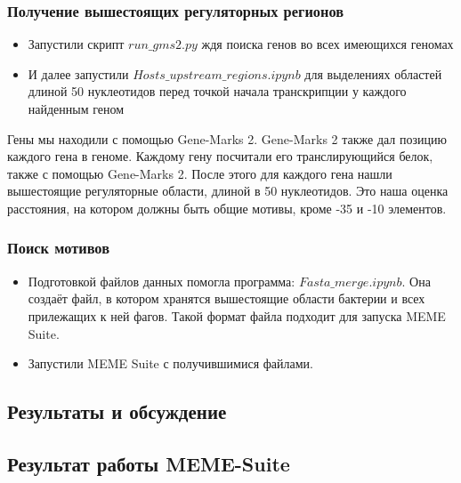 \documentclass[14pt]{extarticle}
\begin{document}
    \begin{center}
    \item \subsubsection{Получение вышестоящих регуляторных регионов}
    \end{center}
        \begin{itemize}
            \item Запустили скрипт \(run\_gms2.py\) ждя поиска генов во всех имеющихся геномах
            \item И далее запустили \(Hosts\_upstream\_regions.ipynb\) для выделениях областей длиной 50 нуклеотидов 
            перед точкой начала транскрипции у каждого найденным геном
        \end{itemize}
    \par{Гены мы находили с помощью Gene-Marks 2. Gene-Marks 2 также дал позицию каждого гена в геноме. Каждому гену 
    посчитали его транслирующийся белок, также с помощью Gene-Marks 2. После этого для каждого гена нашли вышестоящие 
    регуляторные области, длиной в 50 нуклеотидов. Это наша оценка расстояния, на котором должны быть общие мотивы, 
    кроме -35 и -10 элементов.}
    \begin{center}
    \item \subsubsection{Поиск мотивов}
    \end{center}
        \begin{itemize}
            \item Подготовкой файлов данных помогла программа: \(Fasta\_merge.ipynb\). Она создаёт файл, в котором 
            хранятся вышестоящие области бактерии и всех прилежащих к ней фагов. Такой формат файла подходит для запуска
            MEME Suite.
            \item Запустили MEME Suite с получившимися файлами.
        \end{itemize}

\newpage
\begin{center}
    \item \section{Результаты и обсуждение}
    \item \subsection{Результат работы MEME-Suite}
\end{center}
\end{document}
